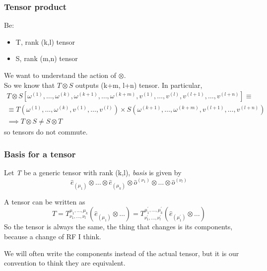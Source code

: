 \subsubsection{Tensor product}
Be:
\begin{itemize}
	\item T, rank (k,l) tensor
	\item S, rank (m,n) tensor
\end{itemize} 
We want to understand the action of $\otimes$. \\
So we know that $T\otimes S$ outputs (k+m, l+n) tensor. In particular,
\begin{gather*}
	T\otimes S \left[\omega^{\left( 1 \right)}, \ldots, \omega^{\left( k \right)}, \omega^{\left( k+1 \right)}, \ldots , \omega^{\left( k+m \right)}, v^{\left( 1 \right)}, \ldots , v^{\left( l \right)}, v^{\left( l+1 \right)}, \ldots , v^{\left( l+n \right)}\right] \equiv \\
	\equiv T\left( \omega^{\left( 1 \right)}, \ldots , \omega^{\left( k \right)}, v^{\left( 1 \right)}, \ldots , v^{\left( l \right)} \right) \times S\left( \omega^{\left( k+1 \right)}, \ldots , \omega^{\left( k+m \right)}, v^{\left( l+1 \right)}, \ldots , v^{\left( l+n \right)} \right) \\
	\implies T \otimes S \neq S \otimes T
\end{gather*}
so tensors do not commute.\\

\subsubsection{Basis for a tensor}
Let \emph{T} be a generic tensor with rank (k,l), \emph{basis} is given by
\[
\hat{e}_{\left( \mu_{1} \right)} \otimes \ldots \otimes \hat{e}_{( \mu_{k})} \otimes  \hat{o}^{\left( \nu_{1} \right)} \otimes \ldots \otimes \hat{o}^{(\nu_{l})}
\]

 A tensor can be written as 
 \[
 T = T^{\mu_{1}, \ldots , \mu_{k}}_{\nu_{1}, ..., \nu_{l}} \left( \hat{e}_{\left( \mu_{1} \right)} \otimes \ldots  \right) = T^{\mu_{1}^{'}, \ldots , \mu_{k}^{'}}_{\nu_{1}^{'}, \ldots , \nu _{l}^{'}}\left( \hat{e}_{\left( \mu_{1}^{'}  \right)} \otimes \ldots  \right)
 \]
So the tensor is always the same, the thing that changes is its components, because a change of RF I think.

We will often write the components instead of the actual tensor, but it is our convention to think they are equivalent.

